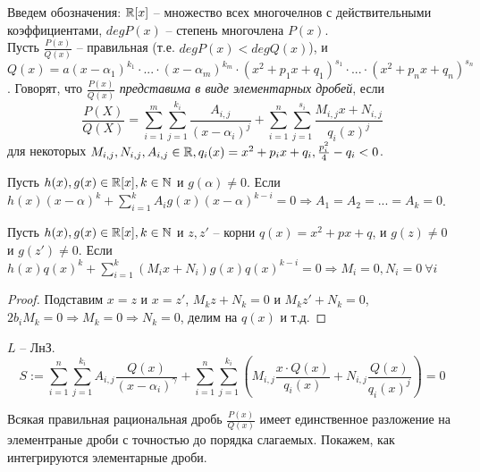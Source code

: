 Введем обозначения: 
$\mathbb{R}[x]$ -- множество всех многочелнов с действительными коэффициентами, $deg P(x)$ -- степень многочлена $P(x)$.\\
Пусть $\frac{P(x)}{Q(x)}$ -- правильная (т.е. $deg P(x) < deg Q(x)$), и $Q(x) = a(x-\alpha_{1})^{k_{1}}\cdot ... \cdot (x-\alpha_{m})^{k_{m}}\cdot (x^2 + p_{1}x + q_{1})^{s_{1}}\cdot ... \cdot (x^2 + p_{n}x + q_{n})^{s_{n}}$.
Говорят, что $\frac{P(x)}{Q(x)}$ \textit{представима в виде элементарных дробей}, если 
\[\frac{P(X)}{Q(X)} = \sum_{i=1}^{m} \sum_{j=1}^{k_{i}} \frac{A_{i,j}}{(x-\alpha_{i})^{j}} +  \sum_{i=1}^{n} \sum_{j=1}^{s_{i}} \frac{M_{i,j}x + N_{i,j}}{q_{i}(x)^{j}}\]
для некоторых $M_{i,j}, N_{i,j}, A_{i,j} \in \mathbb{R}, q_{i}(x) = x^2 + p_{i}x + q_{i}, \frac{p_{i}^{2}}{4} - q_{i} < 0$.

\begin{lemma}
    Пусть $h(x), g(x) \in \mathbb{R}[x], k \in \mathbb{N}$ и $g(\alpha) \neq 0$. Если $h(x)(x-\alpha)^{k} + \sum_{i = 1}^{k} A_{i}g(x)(x-\alpha)^{k-i} = 0 \Rightarrow A_{1} = A_{2} = ... = A_{k} = 0$.
\end{lemma}

\begin{lemma}
    Пусть $h(x), g(x) \in \mathbb{R}[x], k \in \mathbb{N}$ и $z, z'$ -- корни $q(x) = x^2 + px + q$, и $g(z) \neq 0$ и $g(z')\neq 0$. Если $h(x)q(x)^{k} + \sum_{i = 1}^{k}(M_{i}x + N_{i})g(x)q(x)^{k-i} = 0 \Rightarrow M_{i} = 0, N_{i} = 0 \ \forall i$
\end{lemma}

\begin{proof}
    Подставим $x = z \text{ и } x = z'$, $M_{k}z + N_{k} = 0 \text{ и } M_{k}z' + N_{k} = 0$, $2b_{i}M_{k} = 0 \Rightarrow M_{k} = 0 \Rightarrow N_{k} = 0$, делим на $q(x)$ и т.д.
\end{proof}

\begin{note}
    $L$ -- ЛнЗ.
    \[S := \sum_{i=1}^{n} \sum_{j = 1}^{k_{i}} A_{i,j} \frac{Q(x)}{(x-\alpha_{i})^{\gamma}} + \sum_{i = 1}^{n} \sum_{j = 1}^{k_{i}} (M_{i,j} \frac{x\cdot Q(x)}{q_{i}(x)} + N_{i,j} \frac{Q(x)}{q_{i}(x)^{j}}) = 0 \]
\end{note}

Всякая правильная рациональная дробь $\frac{P(x)}{Q(x)}$ имеет единственное разложение на элементраные дроби с точностью до порядка слагаемых.
Покажем, как интегрируются элементарные дроби.

